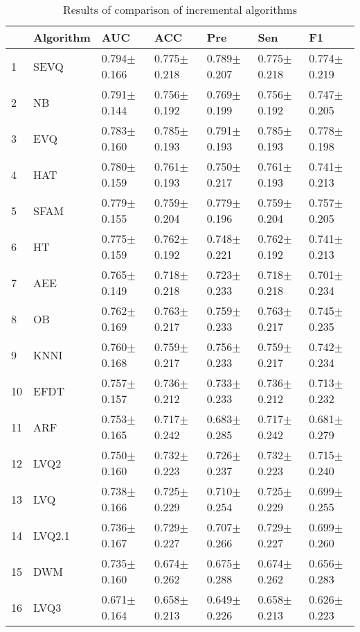 \begin{table}[H]
\footnotesize
\centering
\caption{Results of comparison of incremental algorithms}
\label{tab:Incremental comparison}
\begin{tabular}{lllllll}
\hline
{} & Algorithm &              AUC &         ACC &        Pre &           Sen &               F1 \\
\hline
1  &      SEVQ &  0.794$\pm$0.166 &  0.775$\pm$0.218 &  0.789$\pm$0.207 &  0.775$\pm$0.218 &  0.774$\pm$0.219 \\
2  &        NB &  0.791$\pm$0.144 &  0.756$\pm$0.192 &  0.769$\pm$0.199 &  0.756$\pm$0.192 &  0.747$\pm$0.205 \\
3  &       EVQ &  0.783$\pm$0.160 &  0.785$\pm$0.193 &  0.791$\pm$0.193 &  0.785$\pm$0.193 &  0.778$\pm$0.198 \\
4  &       HAT &  0.780$\pm$0.159 &  0.761$\pm$0.193 &  0.750$\pm$0.217 &  0.761$\pm$0.193 &  0.741$\pm$0.213 \\
5  &      SFAM &  0.779$\pm$0.155 &  0.759$\pm$0.204 &  0.779$\pm$0.196 &  0.759$\pm$0.204 &  0.757$\pm$0.205 \\
6  &        HT &  0.775$\pm$0.159 &  0.762$\pm$0.192 &  0.748$\pm$0.221 &  0.762$\pm$0.192 &  0.741$\pm$0.213 \\
7  &       AEE &  0.765$\pm$0.149 &  0.718$\pm$0.218 &  0.723$\pm$0.233 &  0.718$\pm$0.218 &  0.701$\pm$0.234 \\
8  &        OB &  0.762$\pm$0.169 &  0.763$\pm$0.217 &  0.759$\pm$0.233 &  0.763$\pm$0.217 &  0.745$\pm$0.235 \\
9  &      KNNI &  0.760$\pm$0.168 &  0.759$\pm$0.217 &  0.756$\pm$0.233 &  0.759$\pm$0.217 &  0.742$\pm$0.234 \\
10 &      EFDT &  0.757$\pm$0.157 &  0.736$\pm$0.212 &  0.733$\pm$0.233 &  0.736$\pm$0.212 &  0.713$\pm$0.232 \\
11 &       ARF &  0.753$\pm$0.165 &  0.717$\pm$0.242 &  0.683$\pm$0.285 &  0.717$\pm$0.242 &  0.681$\pm$0.279 \\
12 &      LVQ2 &  0.750$\pm$0.160 &  0.732$\pm$0.223 &  0.726$\pm$0.237 &  0.732$\pm$0.223 &  0.715$\pm$0.240 \\
13 &       LVQ &  0.738$\pm$0.166 &  0.725$\pm$0.229 &  0.710$\pm$0.254 &  0.725$\pm$0.229 &  0.699$\pm$0.255 \\
14 &    LVQ2.1 &  0.736$\pm$0.167 &  0.729$\pm$0.227 &  0.707$\pm$0.266 &  0.729$\pm$0.227 &  0.699$\pm$0.260 \\
15 &       DWM &  0.735$\pm$0.160 &  0.674$\pm$0.262 &  0.675$\pm$0.288 &  0.674$\pm$0.262 &  0.656$\pm$0.283 \\
16 &      LVQ3 &  0.671$\pm$0.164 &  0.658$\pm$0.213 &  0.649$\pm$0.226 &  0.658$\pm$0.213 &  0.626$\pm$0.223 \\
\hline
\end{tabular}
\end{table}
